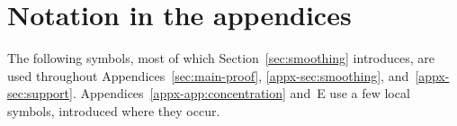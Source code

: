 \documentclass[11pt,letterpaper]{article}
\newif\ifshowrev
\newenvironment{revblock}{\ifshowrev\color{revblue}%
\hypersetup{linkcolor=revblue,citecolor=revblue,urlcolor=revblue}\fi}{}
\newif\ifshowtrim
\newcommand{\trs}[1]{\ifshowtrim{\color{revblue}#1}\else#1\fi}
\theoremstyle{remark}
\begin{document}
\clearpage
\appendix
{}
\begin{revblock}
\section*{Notation in the appendices}
The following symbols, most of which Section~\ref{sec:smoothing}
introduces, are used throughout
Appendices~\trs{\ref{sec:main-proof}, \ref{appx-sec:smoothing},}
and~\trs{\ref{appx-sec:support}}.
Appendices~\trs{\ref{appx-app:concentration}} and~E use a few local
symbols, introduced where they occur.


\end{revblock}
\end{document}

